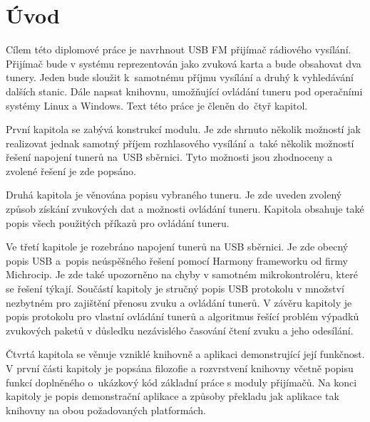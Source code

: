 \section{Úvod}
\label{sec:Uvod}

Cílem této diplomové práce je navrhnout USB FM přijímač rádiového vysílání. Přijímač bude v systému reprezentován jako zvuková karta a bude obsahovat dva tunery. Jeden bude sloužit k~samotnému příjmu vysílání a druhý k vyhledávání dalších stanic. Dále napsat knihovnu, umožňující ovládání tuneru pod operačními systémy Linux a Windows. Text této práce je členěn do~čtyř kapitol.

První kapitola se zabývá konstrukcí modulu. Je zde shrnuto několik možností jak realizovat jednak samotný příjem rozhlasového vysílání a~také několik možností řešení napojení tunerů na~USB sběrnici. Tyto možnosti jsou zhodnoceny a zvolené řešení je zde popsáno.

Druhá kapitola je věnována popisu vybraného tuneru. Je zde uveden zvolený způsob získání zvukových dat a možnosti ovládání tuneru. Kapitola obsahuje také popis všech použitých příkazů pro ovládání tuneru.

Ve třetí kapitole je rozebráno napojení tunerů na USB sběrnici. Je zde obecný popis USB a~popis neúspěšného řešení pomocí Harmony frameworku od firmy Michrocip. Je zde také upozorněno na chyby v samotném mikrokontroléru, které se řešení týkají. Součástí kapitoly je stručný popis USB protokolu v množství nezbytném pro zajištění přenosu zvuku a ovládání tunerů. V závěru kapitoly je popis protokolu pro vlastní ovládání tunerů a algoritmus řešící problém výpadků zvukových paketů v důsledku nezávislého časování čtení zvuku a jeho odesílání. 

Čtvrtá kapitola se věnuje vzniklé knihovně a aplikaci demonstrující její funkčnost. V první části kapitoly je popsána filozofie a rozvrstvení knihovny včetně popisu funkcí doplněného o~ukázkový kód základní práce s moduly přijímačů. Na konci kapitoly je popis demonstrační aplikace a způsoby překladu jak aplikace tak knihovny na obou požadovaných platformách.

